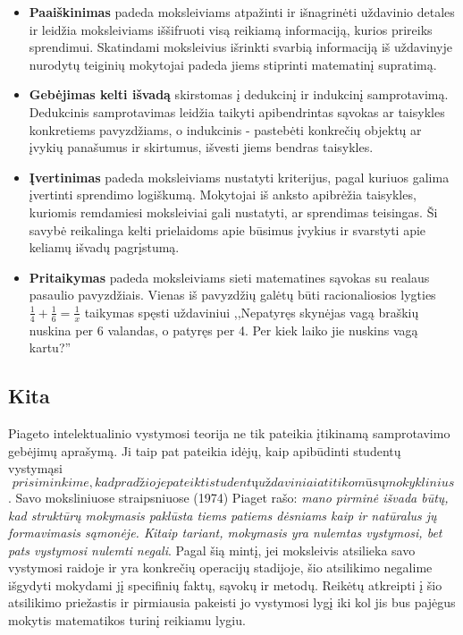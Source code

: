 \documentclass{article}
\begin{document}
\begin{itemize}
\item \textbf{Paaiškinimas} padeda moksleiviams atpažinti ir išnagrinėti uždavinio detales ir leidžia moksleiviams iššifruoti visą reikiamą informaciją, kurios prireiks sprendimui. Skatindami moksleivius išrinkti svarbią informaciją iš uždavinyje nurodytų teiginių mokytojai padeda jiems stiprinti matematinį supratimą.
\item \textbf{Gebėjimas kelti išvadą} skirstomas į dedukcinį ir indukcinį samprotavimą. Dedukcinis samprotavimas leidžia taikyti apibendrintas sąvokas ar taisykles konkretiems pavyzdžiams, o indukcinis - pastebėti konkrečių objektų ar įvykių panašumus ir skirtumus, išvesti jiems bendras taisykles.
\item \textbf{Įvertinimas} padeda moksleiviams nustatyti kriterijus, pagal kuriuos galima įvertinti sprendimo logiškumą. Mokytojai iš anksto apibrėžia taisykles, kuriomis remdamiesi moksleiviai gali nustatyti, ar sprendimas teisingas. Ši savybė reikalinga kelti prielaidoms apie būsimus įvykius ir svarstyti apie keliamų išvadų pagrįstumą.
\item \textbf{Pritaikymas} padeda moksleiviams sieti matematines sąvokas su realaus pasaulio pavyzdžiais. Vienas iš pavyzdžių galėtų būti racionaliosios lygties $\frac{1}{4}+\frac{1}{6}=\frac{1}{x}$ taikymas spęsti uždaviniui ,,Nepatyręs skynėjas vagą braškių nuskina per 6 valandas, o patyręs per 4. Per kiek laiko jie nuskins vagą kartu?''
\end{itemize}

\subsection{Kita}

Piageto intelektualinio vystymosi teorija ne tik pateikia įtikinamą samprotavimo gebėjimų aprašymą. Ji taip pat pateikia idėjų, kaip apibūdinti studentų vystymąsi \[prisiminkime, kad pradžioje pateikti studentų uždaviniai atitiko mūsų mokyklinius\]. Savo moksliniuose straipsniuose (1974) Piaget rašo: \textit{mano pirminė išvada būtų, kad struktūrų mokymasis paklūsta tiems patiems dėsniams kaip ir natūralus jų formavimasis sąmonėje. Kitaip tariant, mokymasis yra nulemtas vystymosi, bet pats vystymosi nulemti negali}. Pagal šią mintį, jei moksleivis atsilieka savo vystymosi raidoje ir yra konkrečių operacijų stadijoje, šio atsilikimo negalime išgydyti mokydami jį specifinių faktų, sąvokų ir metodų. Reikėtų atkreipti į šio atsilikimo priežastis ir pirmiausia pakeisti jo vystymosi lygį iki kol jis bus pajėgus mokytis matematikos turinį reikiamu lygiu.
\end{document}
